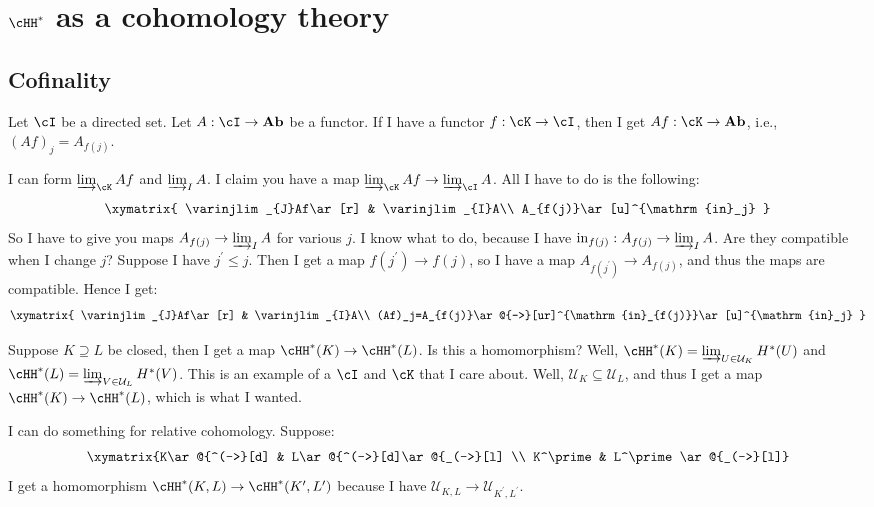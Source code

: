 \section{$\cHH^\ast$ as a cohomology theory}

\subsection{Cofinality}
Let $\cI$ be a directed set. Let $A:\cI\to \mathbf{Ab}$ be a functor. If I have a functor $f:\cK\to\cI$, then I get $Af:\cK\to\mathbf{Ab}$, i.e., $(Af)_j=A_{f(j)}$.

I can form $\varinjlim_{\cK}Af$ and $\varinjlim_{I}A$. I claim you have a map $\varinjlim_{\cK}Af\to\varinjlim_{\cI}A$. All I have to do is the following:
\begin{equation*}
\xymatrix{
	\varinjlim_{J}Af\ar[r] & \varinjlim_{I}A\\
	A_{f(j)}\ar[u]^{\mathrm{in}_j}
}
\end{equation*}
So I have to give you maps $A_{f(j)}\to\varinjlim_{I}A$ for various $j$. I know what to do, because I have $\mathrm{in}_{f(j)}:A_{f(j)}\to\varinjlim_{I}A$. Are they compatible when I change $j$? Suppose I have $j^\prime\leq j$. Then I get a map $f(j^\prime)\to f(j)$, so I have a map $A_{f(j^\prime)}\to A_{f(j)}$, and thus the maps are compatible. Hence I get:
\begin{equation*}
\xymatrix{
	\varinjlim_{J}Af\ar[r] & \varinjlim_{I}A\\
	(Af)_j=A_{f(j)}\ar@{-->}[ur]^{\mathrm{in}_{f(j)}}\ar[u]^{\mathrm{in}_j}
}
\end{equation*}
\begin{example}
Suppose $K\supseteq L$ be closed, then I get a map $\cHH^\ast(K)\to\cHH^\ast(L)$. Is this a homomorphism? Well, $\cHH^\ast(K)=\varinjlim_{U\in\mathcal{U}_K}H^\ast(U)$ and $\cHH^\ast(L)=\varinjlim_{V\in\mathcal{U}_L}H^\ast(V)$. This is an example of a $\cI$ and $\cK$ that I care about. Well, $\mathcal{U}_K\subseteq\mathcal{U}_L$, and thus I get a map $\cHH^\ast(K)\to\cHH^\ast(L)$, which is what I wanted.

I can do something for relative cohomology. Suppose:
\begin{equation*}
\xymatrix{K\ar@{^(->}[d] & L\ar@{^(->}[d]\ar@{_(->}[l] \\ K^\prime & L^\prime\ar@{_(->}[l]}
\end{equation*}
I get a homomorphism $\cHH^\ast(K,L)\to \cHH^\ast(K^\prime,L^\prime)$ because I have $\mathcal{U}_{K,L}\to\mathcal{U}_{K^\prime,L^\prime}$.
\end{example}
